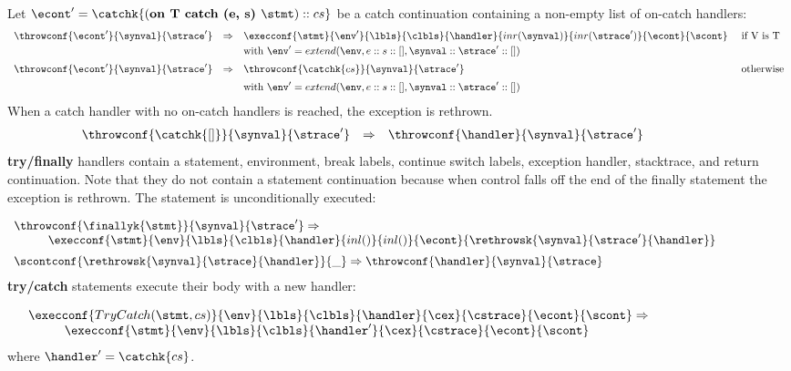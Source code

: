 \documentclass{article}
\begin{document}
\noindent
Let $\econt' = \catchk{(\textbf{on T catch (e, s) }\stmt) :: cs}$ be a catch continuation containing a non-empty list of on-catch handlers:
\[
  \begin{array}{lcll}
	\throwconf{\econt'}{\synval}{\strace'}
	& \Rightarrow &
	\execconf{\stmt}{\env'}{\lbls}{\clbls}{\handler}{inr(\synval)}{inr(\strace')}{\econt}{\scont}
	&\textrm{ if V is T}\\[1mm]

	&&\textrm{with } \env' = extend(\env, e :: s :: [], \synval :: \strace' :: [])\\[2mm]

	\throwconf{\econt'}{\synval}{\strace'}
	& \Rightarrow &
	\throwconf{\catchk{cs}}{\synval}{\strace'}	&\textrm{ otherwise}\\[2mm]
	&&\textrm{with } \env' = extend(\env, e :: s :: [], \synval :: \strace' :: [])
  \end{array}
\]
\noindent
When a catch handler with no on-catch handlers is reached, the exception is rethrown.
\[
  \begin{array}{lcll}
	\throwconf{\catchk{[]}}{\synval}{\strace'}
	& \Rightarrow &
	\throwconf{\handler}{\synval}{\strace'}\hspace{20mm}
  \end{array}
\]
\noindent
\textbf{try/finally} handlers contain a statement, environment, break labels, continue switch labels, exception handler, stacktrace, and return continuation. Note that they do not contain a statement continuation because when control falls off the end of the finally statement the exception is rethrown. The statement is unconditionally executed:

\[
  \begin{array}{lcl}
	\throwconf{\finallyk{\stmt}}{\synval}{\strace'}
	\Rightarrow \\
	\hspace{10mm}\execconf{\stmt}{\env}{\lbls}{\clbls}{\handler}{inl()}{inl()}{\econt}{\rethrowsk{\synval}{\strace'}{\handler}}\hspace{20mm}\\[2mm]

	\scontconf{\rethrowsk{\synval}{\strace}{\handler}}{\_}
	\Rightarrow \throwconf{\handler}{\synval}{\strace}

  \end{array}
\]
\noindent
\textbf{try/catch} statements execute their body with a new handler:

\[
  \begin{array}{lcl}
	\execconf{TryCatch(\stmt, cs)}{\env}{\lbls}{\clbls}{\handler}{\cex}{\cstrace}{\econt}{\scont}
	\Rightarrow\\
	\hspace{10mm}\execconf{\stmt}{\env}{\lbls}{\clbls}{\handler'}{\cex}{\cstrace}{\econt}
	{\scont}\hspace{50mm}
  \end{array}
\]
where $\handler' = \catchk{cs}$.
\end{document}
